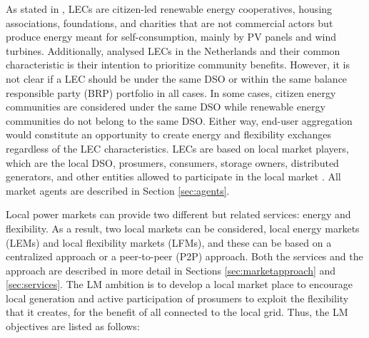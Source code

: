 As stated in \cite{sajn2016electricity}, LECs are citizen-led renewable energy cooperatives, housing associations, foundations, and charities that are not commercial actors but produce energy meant for self-consumption, mainly by PV panels and wind turbines. Additionally, \cite{van2015power} analysed LECs in the Netherlands and their common characteristic is their intention to prioritize community benefits. However, it is not clear if a LEC should be under the same DSO or within the same balance responsible party (BRP) portfolio in all cases. In some cases, citizen energy communities are considered under the same DSO while renewable energy communities do not belong to the same DSO. Either way, end-user aggregation would constitute an opportunity to create energy and flexibility exchanges regardless of the LEC characteristics. LECs are based on local market players, which are the local DSO, prosumers, consumers, storage owners, distributed generators, and other entities allowed to participate in the local market \cite{faber2014micro}. All market agents are described in Section \ref{sec:agents}.

Local power markets can provide two different but related services: energy and flexibility. As a result, two local markets can be considered, local energy markets (LEMs) and local flexibility markets (LFMs), and these can be based on a centralized approach or a peer-to-peer (P2P) approach. Both the services and the approach are described in more detail in Sections \ref{sec:marketapproach} and \ref{sec:services}. The LM ambition is to develop a local market place to encourage local generation and active participation of prosumers to exploit the flexibility that it creates, for the benefit of all connected to the local grid. Thus, the LM objectives are listed as follows:

